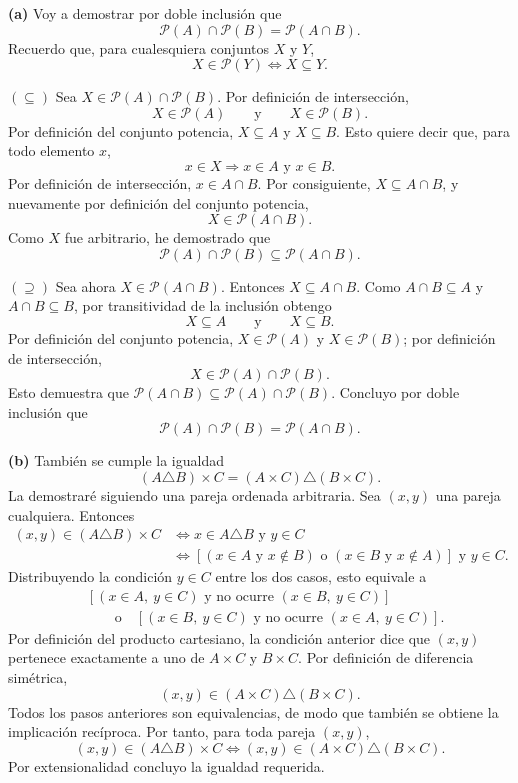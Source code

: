 \documentclass[11pt]{article}
\newcommand{\Pow}{\mathcal{P}}
\begin{document}
\begin{solution}
\textbf{(a)} Voy a demostrar por doble inclusión que
\[
\boxed{\Pow(A)\cap\Pow(B)=\Pow(A\cap B)}.
\]
Recuerdo que, para cualesquiera conjuntos $X$ y $Y$,
\[
X\in\Pow(Y)\Longleftrightarrow X\subseteq Y.
\]

$(\subseteq)$ Sea $X\in\Pow(A)\cap\Pow(B)$. Por definición de intersección,
\[
X\in\Pow(A)\qquad\text{y}\qquad X\in\Pow(B).
\]
Por definición del conjunto potencia, $X\subseteq A$ y $X\subseteq B$.
Esto quiere decir que, para todo elemento $x$,
\[
x\in X\Longrightarrow x\in A\text{ y }x\in B.
\]
Por definición de intersección, $x\in A\cap B$. Por consiguiente,
$X\subseteq A\cap B$, y nuevamente por definición del conjunto potencia,
\[
X\in\Pow(A\cap B).
\]
Como $X$ fue arbitrario, he demostrado que
\[
\Pow(A)\cap\Pow(B)\subseteq\Pow(A\cap B).
\]

$(\supseteq)$ Sea ahora $X\in\Pow(A\cap B)$. Entonces
$X\subseteq A\cap B$. Como $A\cap B\subseteq A$ y $A\cap B\subseteq B$,
por transitividad de la inclusión obtengo
\[
X\subseteq A\qquad\text{y}\qquad X\subseteq B.
\]
Por definición del conjunto potencia, $X\in\Pow(A)$ y $X\in\Pow(B)$; por
definición de intersección,
\[
X\in\Pow(A)\cap\Pow(B).
\]
Esto demuestra que $\Pow(A\cap B)\subseteq\Pow(A)\cap\Pow(B)$.
Concluyo por doble inclusión que
\[
\Pow(A)\cap\Pow(B)=\Pow(A\cap B).
\]

\textbf{(b)} También se cumple la igualdad
\[
\boxed{(A\triangle B)\times C=(A\times C)\triangle(B\times C)}.
\]
La demostraré siguiendo una pareja ordenada arbitraria. Sea $(x,y)$ una
pareja cualquiera. Entonces
\begin{align*}
(x,y)\in(A\triangle B)\times C
&\Longleftrightarrow x\in A\triangle B\text{ y }y\in C\\
&\Longleftrightarrow
  [(x\in A\text{ y }x\notin B)\text{ o }(x\in B\text{ y }x\notin A)]
  \text{ y }y\in C.
\end{align*}
Distribuyendo la condición $y\in C$ entre los dos casos, esto equivale a
\begin{align*}
&[(x\in A,\ y\in C)\text{ y no ocurre }(x\in B,\ y\in C)]\\
&\qquad\text{o}\quad
[(x\in B,\ y\in C)\text{ y no ocurre }(x\in A,\ y\in C)].
\end{align*}
Por definición del producto cartesiano, la condición anterior dice que
$(x,y)$ pertenece exactamente a uno de $A\times C$ y $B\times C$. Por
definición de diferencia simétrica,
\[
(x,y)\in(A\times C)\triangle(B\times C).
\]
Todos los pasos anteriores son equivalencias, de modo que también se obtiene
la implicación recíproca. Por tanto, para toda pareja $(x,y)$,
\[
(x,y)\in(A\triangle B)\times C
\Longleftrightarrow
(x,y)\in(A\times C)\triangle(B\times C).
\]
Por extensionalidad concluyo la igualdad requerida.


\end{solution}
\end{document}
